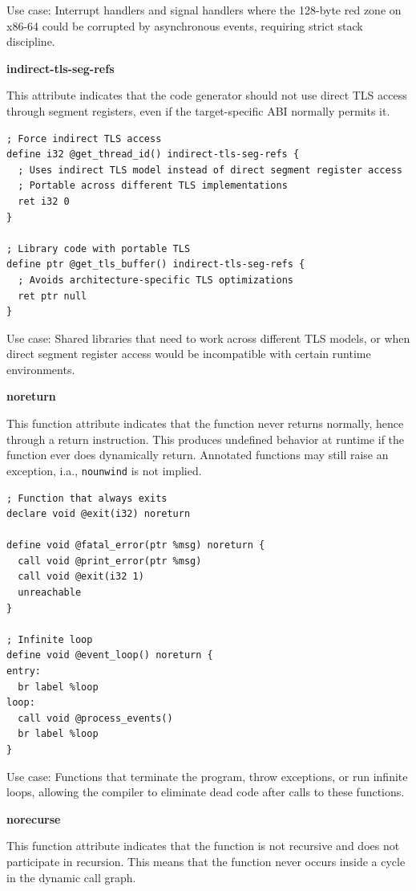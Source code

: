 Use case: Interrupt handlers and signal handlers where the 128-byte red zone on x86-64 could be corrupted by asynchronous events, requiring strict stack discipline.

\textbf{indirect-tls-seg-refs}

This attribute indicates that the code generator should not use direct TLS access through segment registers, even if the target-specific ABI normally permits it.

\begin{lstlisting}[style=ir]
; Force indirect TLS access
define i32 @get_thread_id() indirect-tls-seg-refs {
  ; Uses indirect TLS model instead of direct segment register access
  ; Portable across different TLS implementations
  ret i32 0
}

; Library code with portable TLS
define ptr @get_tls_buffer() indirect-tls-seg-refs {
  ; Avoids architecture-specific TLS optimizations
  ret ptr null
}
\end{lstlisting}

Use case: Shared libraries that need to work across different TLS models, or when direct segment register access would be incompatible with certain runtime environments.

\textbf{noreturn}

This function attribute indicates that the function never returns normally, hence through a return instruction.
This produces undefined behavior at runtime if the function ever does dynamically return.
Annotated functions may still raise an exception, i.a., \texttt{nounwind} is not implied.

\begin{lstlisting}[style=ir]
; Function that always exits
declare void @exit(i32) noreturn

define void @fatal_error(ptr %msg) noreturn {
  call void @print_error(ptr %msg)
  call void @exit(i32 1)
  unreachable
}

; Infinite loop
define void @event_loop() noreturn {
entry:
  br label %loop
loop:
  call void @process_events()
  br label %loop
}
\end{lstlisting}

Use case: Functions that terminate the program, throw exceptions, or run infinite loops, allowing the compiler to eliminate dead code after calls to these functions.

\textbf{norecurse}

This function attribute indicates that the function is not recursive and does not participate in recursion.
This means that the function never occurs inside a cycle in the dynamic call graph.

